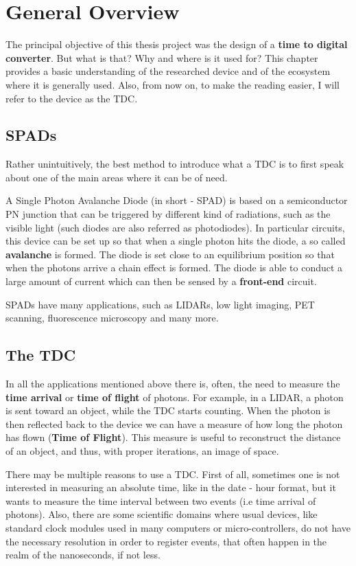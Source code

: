 \chapter{General Overview}
\label{cha:tdc-intro}
The principal objective of this thesis project was the design of a \textbf{time to digital converter}. But what is that? Why and where is it used for? This chapter provides a basic understanding of the researched device and of the ecosystem where it is generally used. Also, from now on, to make the reading easier, I will refer to the device as the TDC.
 



\section{SPADs}
\label{sec:tdc-spads}
Rather unintuitively, the best method to introduce what a TDC is to first speak about one of the main areas where it can be of need.

A Single Photon Avalanche Diode (in short - SPAD) is based on a semiconductor PN junction that can be triggered by different kind of radiations, such as the visible light (such diodes are also referred as photodiodes). In particular circuits, this device can be set up so that when a single photon hits the diode, a so called \textbf{avalanche} is formed. The diode is set close to an equilibrium position so that when the photons arrive a chain effect is formed. The diode is able to conduct a large amount of current which can then be sensed by a \textbf{front-end} circuit.

SPADs have many applications, such as LIDARs, low light imaging, PET scanning, fluorescence microscopy and many more.


\section{The TDC}
\label{sec:tdc-introduction}
In all the applications mentioned above there is, often, the need to measure the \textbf{time arrival} or \textbf{time of flight} of photons. For example, in a LIDAR, a photon is sent toward an object, while the TDC starts counting. When the photon is then reflected back to the device we can have a measure of how long the photon has flown (\textbf{Time of Flight}). This measure is useful to reconstruct the distance of an object, and thus, with proper iterations, an image of space.

There may be multiple reasons to use a TDC. First of all, sometimes one is not interested in measuring an absolute time, like in the date - hour format, but it wants to measure the time interval between two events (i.e time arrival of photons). Also, there are some scientific domains where usual devices, like standard clock modules used in many computers or micro-controllers, do not have the necessary resolution in order to register events, that often happen in the realm of the nanoseconds, if not less.

